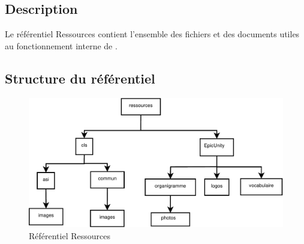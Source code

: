 \subsection{Description}

Le référentiel Ressources contient l'ensemble des fichiers et des documents utiles au fonctionnement
interne de \nomEquipe{}.

\subsection{Structure du référentiel}

\begin{figure}[ht]
         \begin{center}
         \includegraphics[scale=0.62]{images/arboRessources}
         \end{center}
         \caption{Référentiel Ressources}
 \end{figure}


